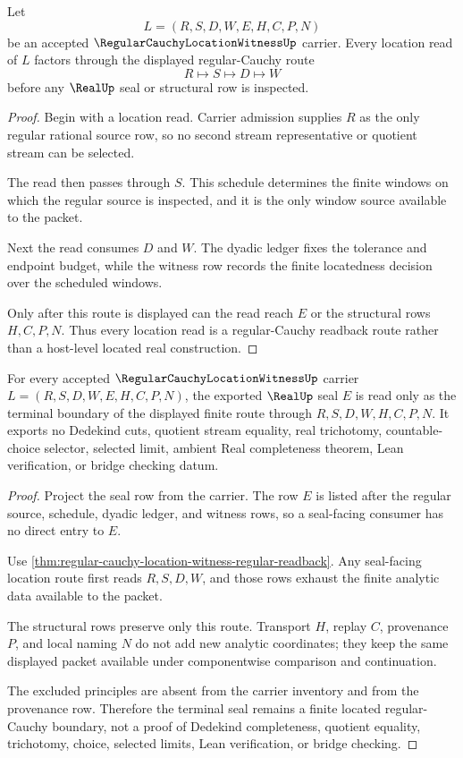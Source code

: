 \begin{theorem}
\label{thm:regular-cauchy-location-witness-regular-readback}
Let
$$
L=(R,S,D,W,E,H,C,P,N)
$$
be an accepted $\RegularCauchyLocationWitnessUp$ carrier. Every location read of $L$ factors through the displayed regular-Cauchy route
$$
R \longmapsto S \longmapsto D \longmapsto W
$$
before any $\RealUp$ seal or structural row is inspected.
\end{theorem}
\begin{proof}
Begin with a location read. Carrier admission supplies $R$ as the only regular rational source row, so no second stream representative or quotient stream can be selected.

The read then passes through $S$. This schedule determines the finite windows on which the regular source is inspected, and it is the only window source available to the packet.

Next the read consumes $D$ and $W$. The dyadic ledger fixes the tolerance and endpoint budget, while the witness row records the finite locatedness decision over the scheduled windows.

Only after this route is displayed can the read reach $E$ or the structural rows $H,C,P,N$. Thus every location read is a regular-Cauchy readback route rather than a host-level located real construction.
\end{proof}

\begin{theorem}
\label{thm:regular-cauchy-location-witness-real-seal-nonescape}
For every accepted $\RegularCauchyLocationWitnessUp$ carrier $L=(R,S,D,W,E,H,C,P,N)$, the exported $\RealUp$ seal $E$ is read only as the terminal boundary of the displayed finite route through $R,S,D,W,H,C,P,N$. It exports no Dedekind cuts, quotient stream equality, real trichotomy, countable-choice selector, selected limit, ambient Real completeness theorem, Lean verification, or bridge checking datum.
\end{theorem}
\begin{proof}
Project the seal row from the carrier. The row $E$ is listed after the regular source, schedule, dyadic ledger, and witness rows, so a seal-facing consumer has no direct entry to $E$.

Use \autoref{thm:regular-cauchy-location-witness-regular-readback}. Any seal-facing location route first reads $R,S,D,W$, and those rows exhaust the finite analytic data available to the packet.

The structural rows preserve only this route. Transport $H$, replay $C$, provenance $P$, and local naming $N$ do not add new analytic coordinates; they keep the same displayed packet available under componentwise comparison and continuation.

The excluded principles are absent from the carrier inventory and from the provenance row. Therefore the terminal seal remains a finite located regular-Cauchy boundary, not a proof of Dedekind completeness, quotient equality, trichotomy, choice, selected limits, Lean verification, or bridge checking.
\end{proof}

